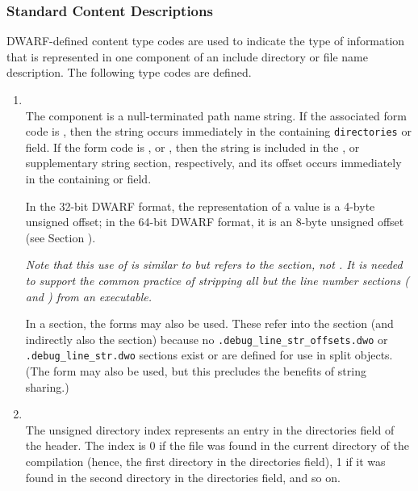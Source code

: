 \subsubsection{Standard Content Descriptions}
\label{chap:standardcontentdescriptions}
DWARF-defined content type codes are used to indicate
the type of information that is represented in one
component of an include directory or file name description.
The following type codes are defined.
\begin{enumerate}[1. ]

\item  \DWLNCTpathTARG \\
The component is a null-terminated path name string.
If the associated form code is \DWFORMstring{}, then the
string occurs immediately in the containing \texttt{directories}
or  field. If the form code is \DWFORMlinestrp{},
\DWFORMstrp{} or \DWFORMstrpsup{}, then the string is included in the 
\dotdebuglinestr{}, \dotdebugstr{} or supplementary string section, 
respectively, and its offset occurs immediately in the containing
 or  field.

In the 32-bit DWARF format, the representation of a
\DWFORMlinestrp{} value is a 4-byte unsigned offset; in the
64-bit DWARF format, it is an 8-byte unsigned offset (see
Section ).

\textit{Note that this use of \DWFORMlinestrp{} is similar to
\DWFORMstrp{} but refers to the \dotdebuglinestr{} section,
not \dotdebugstr. 
It is needed to support the common practice of stripping all but 
the line number sections (\dotdebugline{} and \dotdebuglinestr{}) 
from an executable.
}

In a \dotdebuglinedwo{} section, the forms \DWFORMstrxXNand{} may
also be used. These refer into the \dotdebugstroffsetsdwo{}
section (and indirectly also the \dotdebugstrdwo{} section)
because no \texttt{.debug\_line\_str\_offsets.dwo} or 
\texttt{.debug\_line\_str.dwo} sections exist or are defined for 
use in split objects. (The form \DWFORMstring{} may also be used, 
but this precludes the benefits of string sharing.)
   
\item \DWLNCTdirectoryindexTARG \\
The unsigned directory index represents an entry in the
directories field of the header. The index is 0 if
the file was found in the current directory of the compilation
(hence, the first directory in the directories field),
1 if it was found in the second directory in the directories
field, and so on.


\end{enumerate}
